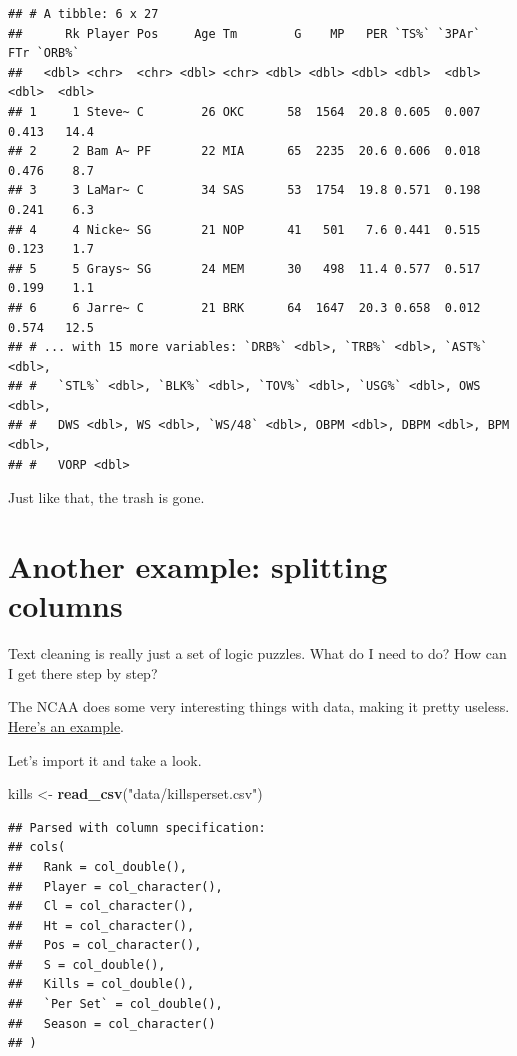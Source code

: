\documentclass[
]{book}
\newenvironment{Shaded}{\begin{snugshade}}{\end{snugshade}}
\newcommand{\KeywordTok}[1]{\textcolor[rgb]{0.13,0.29,0.53}{\textbf{#1}}}
\newcommand{\NormalTok}[1]{#1}
\newcommand{\StringTok}[1]{\textcolor[rgb]{0.31,0.60,0.02}{#1}}
\begin{document}
\begin{verbatim}
## # A tibble: 6 x 27
##      Rk Player Pos     Age Tm        G    MP   PER `TS%` `3PAr`   FTr `ORB%`
##   <dbl> <chr>  <chr> <dbl> <chr> <dbl> <dbl> <dbl> <dbl>  <dbl> <dbl>  <dbl>
## 1     1 Steve~ C        26 OKC      58  1564  20.8 0.605  0.007 0.413   14.4
## 2     2 Bam A~ PF       22 MIA      65  2235  20.6 0.606  0.018 0.476    8.7
## 3     3 LaMar~ C        34 SAS      53  1754  19.8 0.571  0.198 0.241    6.3
## 4     4 Nicke~ SG       21 NOP      41   501   7.6 0.441  0.515 0.123    1.7
## 5     5 Grays~ SG       24 MEM      30   498  11.4 0.577  0.517 0.199    1.1
## 6     6 Jarre~ C        21 BRK      64  1647  20.3 0.658  0.012 0.574   12.5
## # ... with 15 more variables: `DRB%` <dbl>, `TRB%` <dbl>, `AST%` <dbl>,
## #   `STL%` <dbl>, `BLK%` <dbl>, `TOV%` <dbl>, `USG%` <dbl>, OWS <dbl>,
## #   DWS <dbl>, WS <dbl>, `WS/48` <dbl>, OBPM <dbl>, DBPM <dbl>, BPM <dbl>,
## #   VORP <dbl>
\end{verbatim}

Just like that, the trash is gone.

\hypertarget{another-example-splitting-columns}{%
\section{Another example: splitting columns}\label{another-example-splitting-columns}}

Text cleaning is really just a set of logic puzzles. What do I need to do? How can I get there step by step?

The NCAA does some very interesting things with data, making it pretty useless. \href{https://unl.box.com/s/kxjh8k7bm95i8eeovao18nqiky860j1s}{Here's an example}.

Let's import it and take a look.

\begin{Shaded}
\begin{Highlighting}[]
\NormalTok{kills <-}\StringTok{ }\KeywordTok{read_csv}\NormalTok{(}\StringTok{"data/killsperset.csv"}\NormalTok{)}
\end{Highlighting}
\end{Shaded}

\begin{verbatim}
## Parsed with column specification:
## cols(
##   Rank = col_double(),
##   Player = col_character(),
##   Cl = col_character(),
##   Ht = col_character(),
##   Pos = col_character(),
##   S = col_double(),
##   Kills = col_double(),
##   `Per Set` = col_double(),
##   Season = col_character()
## )
\end{verbatim}
\end{document}
